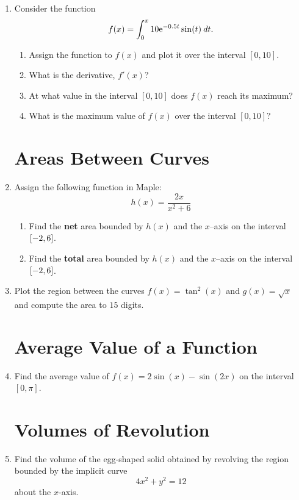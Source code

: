 \begin{enumerate}
\item Consider the function \[ f(x) = \displaystyle\int_{0}^{x} 10 {\rm e}^{-0.5 t} \sin(t) \: dt. \]
	\begin{enumerate}
	\item Assign the function to $f(x)$ and plot it over the interval $[0,10]$.
	\item What is the derivative, $f'(x)$?
	\item At what value in the interval $[0,10]$ does $f(x)$ reach its maximum?
	\item What is the maximum value of $f(x)$ over the interval $[0,10]$?
	\end{enumerate}

\section*{Areas Between Curves}

\item Assign the following function in Maple: $$h(x) = \dfrac{2x}{x^2+6}$$
	\begin{enumerate}
	\item Find the \textbf{net} area bounded by $h(x)$ and the $x$--axis on the interval $\left[-2,6\right]$.
	\item Find the \textbf{total} area bounded by $h(x)$ and the $x$--axis on the interval $\left[-2,6\right]$.
	\end{enumerate}

\item Plot the region between the curves $f(x) = \tan^2(x)$ and $g(x) = \sqrt{x}$ and compute the area to $15$ digits.

\section*{Average Value of a Function}

\item Find the average value of $f(x) = 2\sin(x) - \sin(2x)$ on the interval $[0,\pi]$.
	
\section*{Volumes of Revolution}

\item Find the volume of the egg-shaped solid obtained by revolving the region bounded by the implicit curve \[ 4x^2 + y^2 = 12 \] about the $x$-axis.


\end{enumerate}
